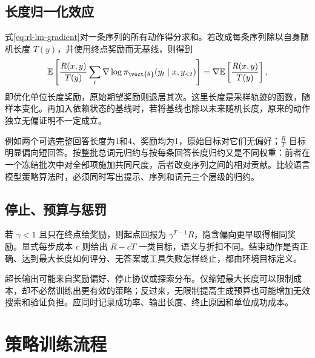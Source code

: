 \documentclass[../textbook.tex]{subfiles}
\begin{document}
\subsection{长度归一化效应}
式\eqref{eq:rl-lm-gradient}对一条序列的所有动作得分求和。若改成每条序列除以自身随机长度 $T(y)$，并使用终点奖励而无基线，则得到
\begin{equation}
 \mathbb E\left[\frac{R(x,y)}{T(y)}\sum_t\nabla\log\pi_{\vect{\theta}}(y_t\mid x,y_{<t})\right]
 =\nabla\mathbb E\left[\frac{R(x,y)}{T(y)}\right],
\end{equation}
即优化单位长度奖励，原始期望奖励则退居其次。这里长度是采样轨迹的函数，随样本变化。再加入依赖状态的基线时，若将基线也除以未来随机长度，原来的动作独立无偏证明不一定成立。

例如两个可选完整回答长度为1和4、奖励均为1，原始目标对它们无偏好；$\frac{R}{T}$ 目标明显偏向短回答。按整批总词元归约与按每条回答长度归约又是不同权重：前者在一个冻结批次中对全部项施加共同尺度，后者改变序列之间的相对贡献。比较语言模型策略算法时，必须同时写出提示、序列和词元三个层级的归约。

\subsection{停止、预算与惩罚}
若 $\gamma<1$ 且只在终点给奖励，则起点回报为 $\gamma^{T-1}R$，隐含偏向更早取得相同奖励。显式每步成本 $c$ 则给出 $R-cT$ 一类目标，语义与折扣不同。结束动作是否正确、达到最大长度如何评分、无答案或工具失败怎样终止，都由环境目标定义。

超长输出可能来自奖励偏好、停止协议或探索分布。仅缩短最大长度可以限制成本，却不必然训练出更有效的策略；反过来，无限制提高生成预算也可能增加无效搜索和验证负担。应同时记录成功率、输出长度、终止原因和单位成功成本。

\section{策略训练流程}
\end{document}
